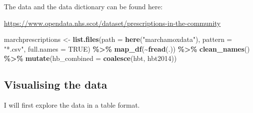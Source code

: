 \documentclass[
]{article}
\newenvironment{Shaded}{\begin{snugshade}}{\end{snugshade}}
\newcommand{\AttributeTok}[1]{\textcolor[rgb]{0.13,0.29,0.53}{#1}}
\newcommand{\ConstantTok}[1]{\textcolor[rgb]{0.56,0.35,0.01}{#1}}
\newcommand{\FunctionTok}[1]{\textcolor[rgb]{0.13,0.29,0.53}{\textbf{#1}}}
\newcommand{\NormalTok}[1]{#1}
\newcommand{\OtherTok}[1]{\textcolor[rgb]{0.56,0.35,0.01}{#1}}
\newcommand{\SpecialCharTok}[1]{\textcolor[rgb]{0.81,0.36,0.00}{\textbf{#1}}}
\newcommand{\StringTok}[1]{\textcolor[rgb]{0.31,0.60,0.02}{#1}}
\begin{document}
The data and the data dictionary can be found here:

\url{https://www.opendata.nhs.scot/dataset/prescriptions-in-the-community}

\begin{Shaded}
\begin{Highlighting}[]
\NormalTok{marchprescriptions }\OtherTok{\textless{}{-}} 
  \FunctionTok{list.files}\NormalTok{(}\AttributeTok{path =} \FunctionTok{here}\NormalTok{(}\StringTok{"marchamoxdata"}\NormalTok{), }\AttributeTok{pattern =} \StringTok{"*.csv"}\NormalTok{, }\AttributeTok{full.names =} \ConstantTok{TRUE}\NormalTok{) }\SpecialCharTok{\%\textgreater{}\%} 
  \FunctionTok{map\_df}\NormalTok{(}\SpecialCharTok{\textasciitilde{}}\FunctionTok{fread}\NormalTok{(.)) }\SpecialCharTok{\%\textgreater{}\%}
  \FunctionTok{clean\_names}\NormalTok{() }\SpecialCharTok{\%\textgreater{}\%} 
  \FunctionTok{mutate}\NormalTok{(}\AttributeTok{hb\_combined =} \FunctionTok{coalesce}\NormalTok{(hbt, hbt2014))}
\end{Highlighting}
\end{Shaded}

\subsection{Visualising the data}\label{visualising-the-data}

I will first explore the data in a table format.
\end{document}
